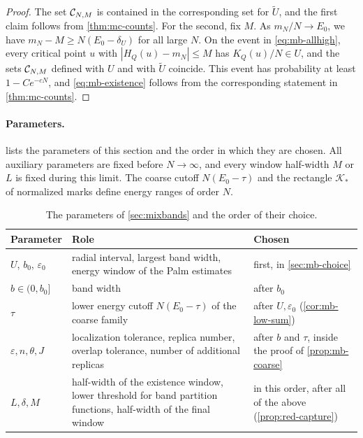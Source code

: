 \begin{proof}
The set $\mathcal C_{N,M}$ is contained in the corresponding set for $\widetilde U$, and the first claim follows from \cref{thm:mc-counts}. For the second, fix $M$. As $m_N/N\to E_0$, we have $m_N-M\ge N(E_0-\delta_U)$ for all large $N$. On the event in \eqref{eq:mb-allhigh}, every critical point $u$ with $|H_Q(u)-m_N|\le M$ has $K_Q(u)/N\in U$, and the sets $\mathcal C_{N,M}$ defined with $U$ and with $\widetilde U$ coincide. This event has probability at least $1-Ce^{-cN}$, and \eqref{eq:mb-existence} follows from the corresponding statement in \cref{thm:mc-counts}.
\end{proof}

\paragraph{Parameters.}
 lists the parameters of this section and the order in which they are chosen. All auxiliary parameters are fixed before $N\to\infty$, and every window half-width $M$ or $L$ is fixed during this limit. The coarse cutoff $N(E_0-\tau)$ and the rectangle $\mathcal K_*$ of normalized marks define energy ranges of order $N$.

\begin{table}[ht]
\centering
\small
\begin{tabular}{@{}l>{\raggedright\arraybackslash}p{6.2cm}>{\raggedright\arraybackslash}p{4.4cm}@{}}
\toprule
Parameter & Role & Chosen \\
\midrule
$U$, $b_0$, $\varepsilon_0$ & radial interval, largest band width, energy window of the Palm estimates & first, in \cref{sec:mb-choice} \\
$b\in(0,b_0]$ & band width & after $b_0$ \\
$\tau$ & lower energy cutoff $N(E_0-\tau)$ of the coarse family & after $U,\varepsilon_0$ (\cref{cor:mb-low-sum}) \\
$\varepsilon,n,\theta,J$ & localization tolerance, replica number, overlap tolerance, number of additional replicas & after $b$ and $\tau$, inside the proof of \cref{prop:mb-coarse} \\
$L,\delta,M$ & half-width of the existence window, lower threshold for band partition functions, half-width of the final window & in this order, after all of the above (\cref{prop:red-capture}) \\
\bottomrule
\end{tabular}
\caption{The parameters of \cref{sec:mixbands} and the order of their choice.}
\label{tab:mb-parameters}
\end{table}

